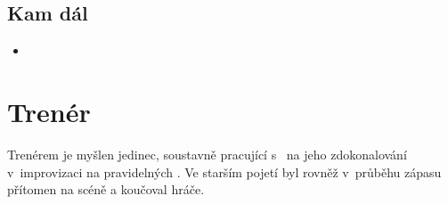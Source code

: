\subsection{ Kam dál } \begin{itemize}
\item  {}
\end{itemize}
 
 
 
\needspace{5cm} \section{Trenér} \label{trenér} Trenérem je myšlen jedinec, soustavně pracující s~ na jeho zdokonalování v~improvizaci na pravidelných 
. 
Ve starším pojetí  byl rovněž v~průběhu zápasu přítomen na scéně a koučoval hráče. 
  
